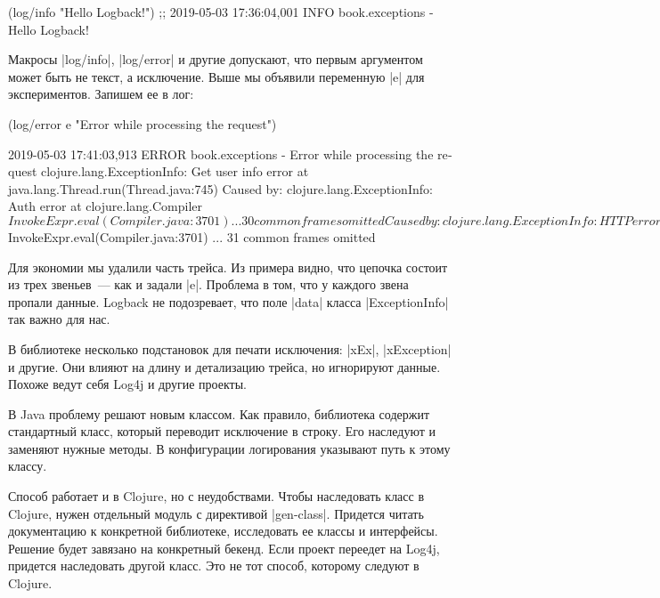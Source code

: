 \begin{english}
  \begin{clojure}
(log/info "Hello Logback!")
;; 2019-05-03 17:36:04,001 INFO book.exceptions - Hello Logback!
  \end{clojure}
\end{english}

\label{log-ex-param}

Макросы \spverb|log/info|, \spverb|log/error| и другие допускают, что первым
аргументом может быть не текст, а исключение. Выше мы объявили переменную
\spverb|e| для экспериментов. Запишем ее в лог:

\begin{english}
  \begin{clojure}
(log/error e "Error while processing the request")

2019-05-03 17:41:03,913 ERROR book.exceptions - Error while processing the request
clojure.lang.ExceptionInfo: Get user info error
    at java.lang.Thread.run(Thread.java:745)
Caused by: clojure.lang.ExceptionInfo: Auth error
    at clojure.lang.Compiler$InvokeExpr.eval(Compiler.java:3701)
    ... 30 common frames omitted
Caused by: clojure.lang.ExceptionInfo: HTTP error
    at clojure.lang.Compiler$InvokeExpr.eval(Compiler.java:3701)
    ... 31 common frames omitted
  \end{clojure}
\end{english}

Для экономии мы удалили часть трейса. Из примера видно, что цепочка состоит из
трех звеньев~--- как и задали \spverb|e|. Проблема в том, что у каждого звена
пропали данные. Logback не подозревает, что поле \spverb|data| класса
\spverb|ExceptionInfo| так важно для нас.

В библиотеке несколько подстановок для печати исключения: \spverb|xEx|,
\spverb|xException| и другие. Они влияют на длину и детализацию трейса, но
игнорируют данные. Похоже ведут себя Log4j и другие проекты.

В Java проблему решают новым классом. Как правило, библиотека содержит
стандартный класс, который переводит исключение в строку. Его наследуют и
заменяют нужные методы. В конфигурации логирования указывают путь к этому
классу.

Способ работает и в Clojure, но с неудобствами. Чтобы наследовать класс в
Clojure, нужен отдельный модуль с директивой \spverb|gen-class|. Придется читать
документацию к конкретной библиотеке, исследовать ее классы и
интерфейсы. Решение будет завязано на конкретный бекенд. Если проект переедет на
Log4j, придется наследовать другой класс. Это не тот способ, которому следуют в
Clojure.

